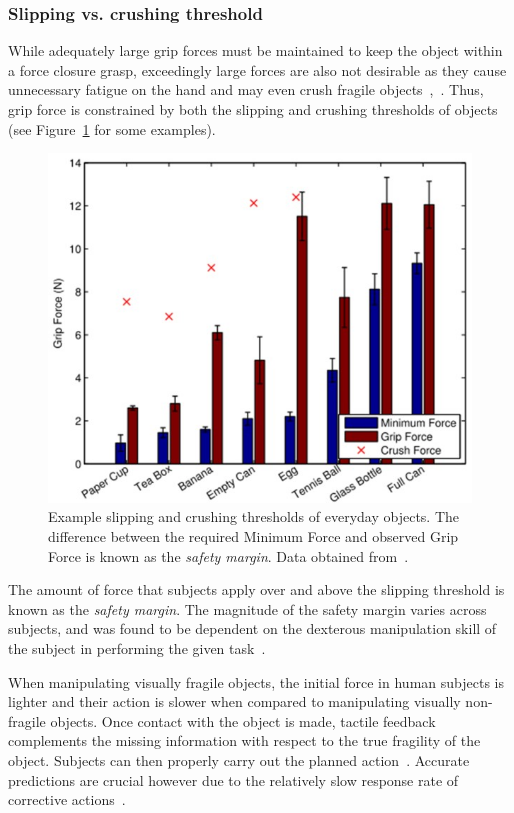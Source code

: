 \subsubsection*{Slipping vs. crushing threshold}
While adequately large grip forces must be maintained to keep the object within a force closure grasp, exceedingly large forces are also not desirable as they cause unnecessary fatigue on the hand and may even crush fragile objects~\cite{johansson1994grasp},~\cite{gorniak2010manipulation}.
Thus, grip force is constrained by both the slipping and crushing thresholds of objects (see Figure~\ref{fig:grip_crush_force} for some examples).

\begin{figure}[]
	\centering
	\includegraphics[width=\linewidth]{images/grip_crush_force}
	\caption{Example slipping and crushing thresholds of everyday objects. The difference between the required Minimum Force and observed Grip Force is known as the \emph{safety margin}. Data obtained from~\cite{romano2011human}.}
	\label{fig:grip_crush_force}
\end{figure}

The amount of force that subjects apply over and above the slipping threshold is known as the \emph{safety margin}.
The magnitude of the safety margin varies across subjects, and was found to be dependent on the dexterous manipulation skill of the subject in performing the given task~\cite{Johansson1984}.

When manipulating visually fragile objects, the initial force in human subjects is lighter and their action is slower when compared to manipulating visually non-fragile objects.
Once contact with the object is made, tactile feedback complements the missing information with respect to the true fragility of the object. 
Subjects can then properly carry out the planned action~\cite{chinellato2008visual}.
Accurate predictions are crucial however due to the relatively slow response rate of corrective actions~\cite{johansson2009coding}.

